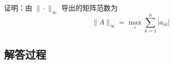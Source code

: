 \begin{example}[矩阵范数证明]
    证明：由 \(\|\cdot\|_\infty\) 导出的矩阵范数为
    \[
    \|A\|_\infty = \max_i \sum_{k=1}^n |a_{ik}|
    \]
    \end{example}
    
    \subsection*{解答过程}
    